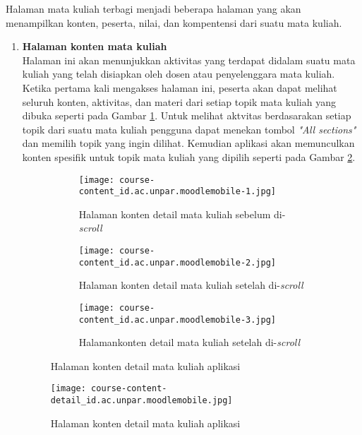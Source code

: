Halaman mata kuliah terbagi menjadi beberapa halaman yang akan menampilkan konten, peserta, nilai, dan kompentensi dari suatu mata kuliah. 
\begin{enumerate}
\item  \textbf{Halaman konten mata kuliah} \\
Halaman ini akan menunjukkan aktivitas yang terdapat didalam suatu mata kuliah yang telah disiapkan oleh dosen atau penyelenggara mata kuliah. Ketika pertama kali mengakses halaman ini, peserta akan dapat melihat seluruh konten, aktivitas, dan materi dari setiap topik mata kuliah yang dibuka seperti pada Gambar \ref{app:content}. Untuk melihat aktvitas berdasarakan setiap topik dari suatu mata kuliah pengguna dapat menekan tombol \textit{"All sections"} dan memilih topik yang ingin dilihat. Kemudian aplikasi akan memunculkan konten spesifik untuk topik mata kuliah yang dipilih seperti pada Gambar \ref{app:content:detail}.

\begin{figure}[H] 
	\centering 
	\begin{subfigure}[ht]{.3\textwidth}
	\centering
	\texttt{[image: course-content\_id.ac.unpar.moodlemobile-1.jpg]}  
	\caption{Halaman konten detail mata kuliah sebelum di-\textit{scroll}}
	\end{subfigure}
	\hfill
	\begin{subfigure}[ht]{.3\textwidth}
	\centering
	\texttt{[image: course-content\_id.ac.unpar.moodlemobile-2.jpg]}  
	\caption{Halaman konten detail mata kuliah setelah di-\textit{scroll}}
	\end{subfigure}
	\hfill
	\begin{subfigure}[ht]{.3\textwidth}
	\centering
	\texttt{[image: course-content\_id.ac.unpar.moodlemobile-3.jpg]}  
	\caption{Halamankonten detail mata kuliah setelah di-\textit{scroll}}
	\end{subfigure} 
	\caption[Halaman konten detail mata kuliah aplikasi] {Halaman konten detail mata kuliah aplikasi} 
	\label{app:content} 
\end{figure}  

\begin{figure}[H] 
	\centering  
	\texttt{[image: course-content-detail\_id.ac.unpar.moodlemobile.jpg]}  
	\caption[Halaman konten detail mata kuliah aplikasi] {Halaman konten detail mata kuliah aplikasi} 
	\label{app:content:detail} 
\end{figure}  


\end{enumerate}
